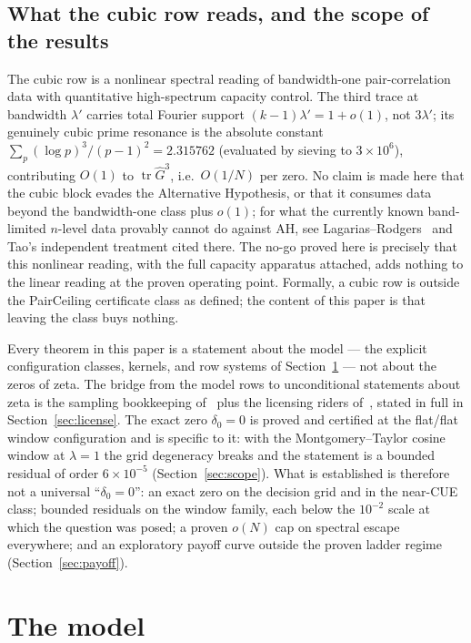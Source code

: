 \documentclass[11pt]{article}
\theoremstyle{plain}
\theoremstyle{definition}
\theoremstyle{remark}
\newcommand{\Gh}{\widehat{G}}
\newcommand{\tr}{\operatorname{tr}}
\begin{document}
\subsection{What the cubic row reads, and the scope of the results}

The cubic row is a nonlinear spectral reading of bandwidth-one
pair-correlation data with quantitative high-spectrum capacity control. The
third trace at bandwidth $\lambda'$ carries total Fourier
support $(k - 1)\lambda' = 1 + o(1)$, not $3\lambda'$; its genuinely cubic prime
resonance is the absolute constant
$\sum_p (\log p)^3/(p - 1)^2 = 2.315762$ (evaluated by sieving to
$3 \times 10^6$), contributing $O(1)$ to $\tr \Gh^3$,
i.e.\ $O(1/N)$ per zero. No claim is made here that the cubic block evades the
Alternative Hypothesis, or that it consumes data beyond the bandwidth-one class
plus $o(1)$; for what the currently known band-limited $n$-level data provably
cannot do against AH, see Lagarias--Rodgers~\cite{LR20} and Tao's independent
treatment cited there. The no-go proved here is precisely that this
nonlinear reading, with the full capacity apparatus attached, adds nothing to
the linear reading at the proven operating point. Formally, a cubic row is
outside the PairCeiling certificate class as defined; the content of this paper
is that leaving the class buys nothing.

Every theorem in this paper is a statement about the model --- the explicit
configuration classes, kernels, and row systems of Section~\ref{sec:model} ---
not about the zeros of zeta. The bridge from the
model rows to unconditional statements about zeta is the sampling bookkeeping
of~\cite{AF26} plus the licensing riders of~\cite{BGSTB24}, stated in full in
Section~\ref{sec:license}. The exact zero $\delta_0 = 0$ is proved and
certified at the flat/flat window configuration and is specific to it: with the
Montgomery--Taylor cosine window at
$\lambda = 1$ the grid degeneracy breaks and the statement is a bounded
residual of order $6 \times 10^{-5}$ (Section~\ref{sec:scope}). What is
established is therefore not a universal ``$\delta_0 = 0$'': an exact zero on
the decision grid and in the near-CUE class; bounded residuals on the window
family, each below the $10^{-2}$ scale at which the question was posed; a proven
$o(N)$ cap on spectral escape everywhere; and an exploratory payoff curve
outside the proven ladder regime (Section~\ref{sec:payoff}).

\section{The model}
\label{sec:model}
\end{document}
